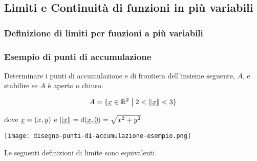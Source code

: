 \subsection{Limiti e Continuità di funzioni in più variabili}

\subsubsection{Definizione di limiti per funzioni a più variabili}



\filbreak{}

\subsubsection*{Esempio di punti di accumulazione}

Determinare i punti di accumulazione e di frontiera dell'insieme seguente, \(A\), e stabilire se \(A\) è aperto o chiuso.

\[
    A = \{\underline{x} \in \mathbb{R}^{2} \;\big|\; 2 < \left\lVert\underline{x}\right\rVert < 3 \}
\]

dove \(\underline{x}=(x,y)\) e \(\left\lVert\underline{x}\right\rVert = d(\underline{x},\underline{0}) = \sqrt{x^{2}+y^{2}}\)
\begin{center}
    \texttt{[image: disegno-punti-di-accumulazione-esempio.png]}
\end{center}

\filbreak{}

Le seguenti definizioni di limite sono equivalenti.

